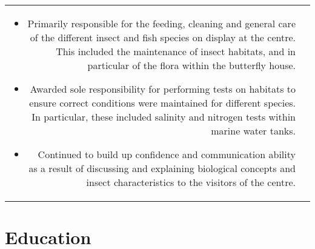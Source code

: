 \documentclass[a4paper, 10pt]{extarticle} %
\begin{document}
\begin{longtable}{r | p{13cm}}
{\vspace{-0.3cm}

\begin{itemize}[leftmargin=*]

\item Primarily responsible for the feeding, cleaning and general care of the different insect and fish species on display at the centre. This included the maintenance of insect habitats, and in particular of the flora within the butterfly house.

\item Awarded sole responsibility for performing tests on habitats to ensure correct conditions were maintained for different species. In particular, these included salinity and nitrogen tests within marine water tanks. 

\item Continued to build up confidence and communication ability as a result of discussing and explaining biological concepts and insect characteristics to the visitors of the centre. 

\vspace{-0.3cm}

\end{itemize}

}

\end{longtable}


\section{Education}
\end{document}

